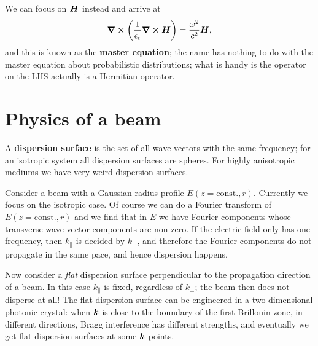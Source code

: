 \documentclass[hyperref, a4paper]{article}
\newcommand*{\const}{\mathrm{const}}
\newcommand*{\concept}[1]{{\textbf{#1}}}
\newcommand{\epsr}{\epsilon_{\text{r}}}
\begin{document}
We can focus on $\vb*{H}$ instead and arrive at 
\begin{equation}
    \curl{\left(\frac{1}{\epsr} \curl{\vb*{H}} \right)} = \frac{\omega^2}{c^2} \vb*{H},
\end{equation}
and this is known as the \concept{master equation}; 
the name has nothing to do with the master equation about probabilistic distributions; 
what is handy is the operator on the LHS actually is a Hermitian operator.

\section{Physics of a beam}

A \concept{dispersion surface} is the set of all wave vectors with the same frequency;
for an isotropic system all dispersion surfaces are spheres.
For highly anisotropic mediums we have very weird dispersion surfaces.

Consider a beam with a Gaussian radius profile $E(z = \const., r)$.
Currently we focus on the isotropic case.
Of course we can do a Fourier transform of $E(z = \const., r)$
and we find that in $E$ we have Fourier components 
whose transverse wave vector components are non-zero.
If the electric field only has one frequency, 
then $k_\parallel$ is decided by $k_\bot$,
and therefore the Fourier components do not propagate in the same pace, 
and hence dispersion happens.

Now consider a \emph{flat} dispersion surface perpendicular 
to the propagation direction of a beam.
In this case $k_\parallel$ is fixed, regardless of $k_\bot$; 
the beam then does not disperse at all!
The flat dispersion surface can be engineered in a two-dimensional photonic crystal:
when $\vb*{k}$ is close to the boundary of the first Brillouin zone, 
in different directions, Bragg interference has different strengths, 
and eventually we get flat dispersion surfaces at some $\vb*{k}$ points.
\end{document}
